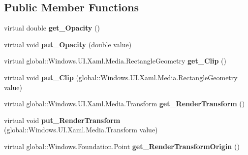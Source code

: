 \subsection*{Public Member Functions}
\begin{DoxyCompactItemize}
\item 
\mbox{\label{class_windows_1_1_u_i_1_1_xaml_1_1_u_i_element_a0653356423d6b2e82584608c68968d68}} 
virtual double {\bfseries get\+\_\+\+Opacity} ()
\item 
\mbox{\label{class_windows_1_1_u_i_1_1_xaml_1_1_u_i_element_a1e20878dd2197db4f727f1ac47480c0a}} 
virtual void {\bfseries put\+\_\+\+Opacity} (double value)
\item 
\mbox{\label{class_windows_1_1_u_i_1_1_xaml_1_1_u_i_element_aadf0b8c76e7c0a2932dead3fd44e570c}} 
virtual global\+::\+Windows.\+U\+I.\+Xaml.\+Media.\+Rectangle\+Geometry {\bfseries get\+\_\+\+Clip} ()
\item 
\mbox{\label{class_windows_1_1_u_i_1_1_xaml_1_1_u_i_element_aa47613e3e5d780689f098981803a451d}} 
virtual void {\bfseries put\+\_\+\+Clip} (global\+::\+Windows.\+U\+I.\+Xaml.\+Media.\+Rectangle\+Geometry value)
\item 
\mbox{\label{class_windows_1_1_u_i_1_1_xaml_1_1_u_i_element_a9556f4a073076052be93c39cd96cb6a0}} 
virtual global\+::\+Windows.\+U\+I.\+Xaml.\+Media.\+Transform {\bfseries get\+\_\+\+Render\+Transform} ()
\item 
\mbox{\label{class_windows_1_1_u_i_1_1_xaml_1_1_u_i_element_af319cc6e684f42a4fb4719f262cf5f5d}} 
virtual void {\bfseries put\+\_\+\+Render\+Transform} (global\+::\+Windows.\+U\+I.\+Xaml.\+Media.\+Transform value)
\item 
\mbox{\label{class_windows_1_1_u_i_1_1_xaml_1_1_u_i_element_a160f3818573614194babfda698182355}} 
virtual global\+::\+Windows.\+Foundation.\+Point {\bfseries get\+\_\+\+Render\+Transform\+Origin} ()
\item 

\end{DoxyCompactItemize}
